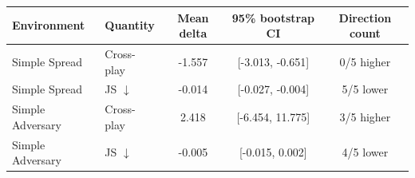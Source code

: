 \begin{tabular}{llccc}
\toprule
Environment & Quantity & Mean delta & 95\% bootstrap CI & Direction count \\
\midrule
Simple Spread & Cross-play & -1.557 & [-3.013, -0.651] & 0/5 higher \\
Simple Spread & JS $\downarrow$ & -0.014 & [-0.027, -0.004] & 5/5 lower \\
\midrule
Simple Adversary & Cross-play & 2.418 & [-6.454, 11.775] & 3/5 higher \\
Simple Adversary & JS $\downarrow$ & -0.005 & [-0.015, 0.002] & 4/5 lower \\
\bottomrule
\end{tabular}
